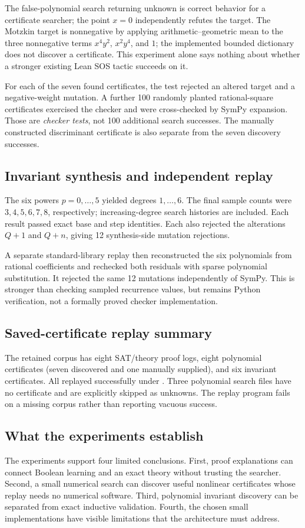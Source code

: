 \documentclass[11pt,letterpaper]{article}
\newcommand{\code}[1]{\texttt{\detokenize{#1}}}
\theoremstyle{definition}\newtheorem{definition}[proposition]{Definition}
\begin{document}
The false-polynomial search returning unknown is correct behavior for a certificate searcher; the point $x=0$ independently refutes the target. The Motzkin target is nonnegative by applying arithmetic--geometric mean to the three nonnegative terms $x^4y^2$, $x^2y^4$, and $1$; the implemented bounded dictionary does not discover a certificate. This experiment alone says nothing about whether a stronger existing Lean SOS tactic succeeds on it.

For each of the seven found certificates, the test rejected an altered target and a negative-weight mutation. A further 100 randomly planted rational-square certificates exercised the checker and were cross-checked by SymPy expansion. Those are \emph{checker tests}, not 100 additional search successes. The manually constructed discriminant certificate is also separate from the seven discovery successes.

\subsection{Invariant synthesis and independent replay}
The six powers $p=0,\ldots,5$ yielded degrees $1,\ldots,6$. The final sample counts were $3,4,5,6,7,8$, respectively; increasing-degree search histories are included. Each result passed exact base and step identities. Each also rejected the alterations $Q+1$ and $Q+n$, giving 12 synthesis-side mutation rejections.

A separate standard-library replay then reconstructed the six polynomials from rational coefficients and rechecked both residuals with sparse polynomial substitution. It rejected the same 12 mutations independently of SymPy. This is stronger than checking sampled recurrence values, but remains Python verification, not a formally proved checker implementation.

\subsection{Saved-certificate replay summary}
The retained corpus has eight SAT/theory proof logs, eight polynomial certificates (seven discovered and one manually supplied), and six invariant certificates. All replayed successfully under \code{python -S}. Three polynomial search files have no certificate and are explicitly skipped as unknowns. The replay program fails on a missing corpus rather than reporting vacuous success.

\subsection{What the experiments establish}
The experiments support four limited conclusions. First, proof explanations can connect Boolean learning and an exact theory without trusting the searcher. Second, a small numerical search can discover useful nonlinear certificates whose replay needs no numerical software. Third, polynomial invariant discovery can be separated from exact inductive validation. Fourth, the chosen small implementations have visible limitations that the architecture must address.
\end{document}
